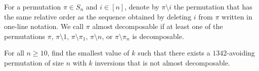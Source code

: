 For a permutation $\pi \in S_n$ and $i \in [n]$, denote by $\pi \setminus i$ the permutation that has the same relative order as the sequence obtained by deleting $i$ from $\pi$ written in one-line notation. We call $\pi$ almost decomposable if at least one of the permutations $\pi$, $\pi \setminus 1$, $\pi \setminus \pi_1$, $\pi \setminus n$, or $\pi \setminus \pi_n$ is decomposable.

For all $n \geq 10$, find the smallest value of $k$ such that there exists a $1342$-avoiding permutation of size $n$ with $k$ inversions that is not almost decomposable.
